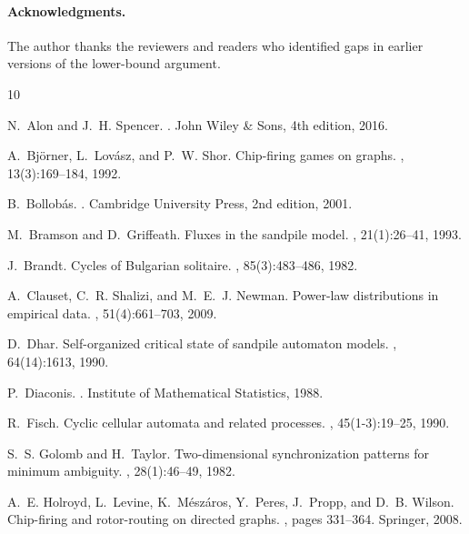 \documentclass[12pt]{article}
\begin{document}
\paragraph{Acknowledgments.} The author thanks the reviewers and readers who identified gaps in earlier versions of the lower-bound argument.

\begin{thebibliography}{10}

N.~Alon and J.~H. Spencer.
.
\newblock John Wiley \& Sons, 4th edition, 2016.

A.~Bj\"{o}rner, L.~Lov\'{a}sz, and P.~W. Shor.
\newblock Chip-firing games on graphs.
, 13(3):169--184, 1992.

B.~Bollob\'{a}s.
.
\newblock Cambridge University Press, 2nd edition, 2001.

M.~Bramson and D.~Griffeath.
\newblock Fluxes in the sandpile model.
, 21(1):26--41, 1993.

J.~Brandt.
\newblock Cycles of Bulgarian solitaire.
, 85(3):483--486, 1982.

A.~Clauset, C.~R. Shalizi, and M.~E.~J. Newman.
\newblock Power-law distributions in empirical data.
, 51(4):661--703, 2009.

D.~Dhar.
\newblock Self-organized critical state of sandpile automaton models.
, 64(14):1613, 1990.

P.~Diaconis.
.
\newblock Institute of Mathematical Statistics, 1988.

R.~Fisch.
\newblock Cyclic cellular automata and related processes.
, 45(1-3):19--25, 1990.

S.~S. Golomb and H.~Taylor.
\newblock Two-dimensional synchronization patterns for minimum ambiguity.
, 28(1):46--49, 1982.

A.~E. Holroyd, L.~Levine, K.~M\'{e}sz\'{a}ros, Y.~Peres, J.~Propp, and D.~B. Wilson.
\newblock Chip-firing and rotor-routing on directed graphs.
, pages 331--364. Springer, 2008.


\end{thebibliography}
\end{document}
